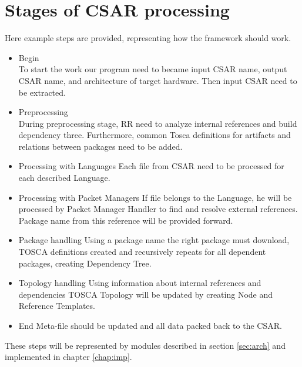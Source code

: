 \section*{Stages of CSAR processing}
Here example steps are provided, representing how the framework should work.
\begin{itemize}  
	\item Begin  \\
	To start the work our program need to became input CSAR name, output CSAR name, and architecture of target hardware. 
	Then input CSAR need to be extracted.
	\item Preprocessing\\
	During preprocessing stage, RR need to analyze internal references and build dependency three.
	Furthermore, common Tosca definitions for artifacts and  relations between packages need to be added.
	\item Processing with Languages
	Each file from CSAR need to be processed for each described Language.
	\item Processing with Packet Managers
    If file belongs to the Language, he will be processed by Packet Manager Handler to find and resolve external references.
    Package name from this reference will be provided forward.
	\item Package handling
	Using a package name the right package must download, TOSCA definitions created and recursively repeats for all dependent packages, creating Dependency Tree.
	\item Topology handling
	Using information about internal references and dependencies TOSCA Topology will be updated by creating Node and Reference Templates. 
	\item End
	Meta-file should be updated and all data packed back to the CSAR.
\end{itemize}
These steps will be represented by modules described in section \ref{sec:arch} and implemented in chapter \ref{chap:imp}.